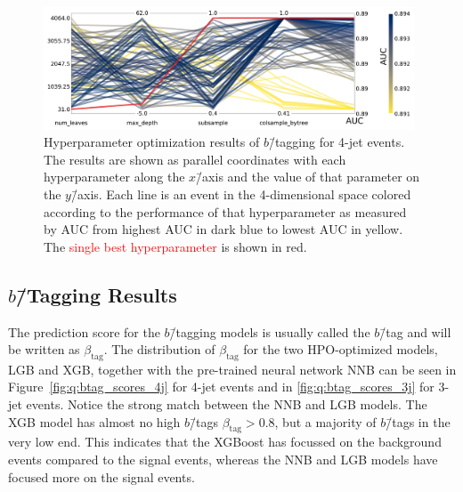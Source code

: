 \begin{figure}
  \includegraphics[width=0.98\textwidth, trim=0 0 0 0, clip]{figures/quarks/CV_viz-njet=4-name=lf_lgb_down_sample=1.00-ML_vars=vertex-selection=b-ejet_min=4-n_iter_RS_lgb=99-n_iter_RS_xgb=9-cdot_cut=0.90-version=19.pdf}
  \caption[Parallel Plot of HPO Results for 4-Jet $b$\=/Tagging]
          {Hyperparameter optimization results of $b$\=/tagging for 4-jet events. The results are shown as parallel coordinates with each hyperparameter along the $x$\=/axis and the value of that parameter on the $y$\=/axis. Each line is an event in the 4-dimensional space colored according to the performance of that hyperparameter as measured by AUC from \textcolor{viridis-dark}{highest} AUC in dark blue to \textcolor{viridis-light}{lowest} AUC in yellow. The \textcolor{red}{single best hyperparameter} is shown in red. 
          } 
  \label{fig:q:initial_CV_res_parallel_coords_4j}
\end{figure}

\subsection{$b$\=/Tagging Results}

The prediction score for the $b$\=/tagging models is usually called the $b$\=/tag and will be written as $\beta_\mathrm{tag}$. The distribution of $\beta_\mathrm{tag}$ for the two HPO-optimized models, LGB and XGB, together with the pre-trained neural network NNB can be seen in Figure~\ref{fig:q:btag_scores_4j} for 4-jet events and in \ref{fig:q:btag_scores_3j} for 3-jet events. Notice the strong match between the NNB and LGB models. The XGB model has almost no high $b$\=/tags $\beta_\mathrm{tag} > 0.8$, but a majority of $b$\=/tags in the very low end. This indicates that the XGBoost has focussed on the background events compared to the signal events, whereas the NNB and LGB models have focused more on the signal events. 

